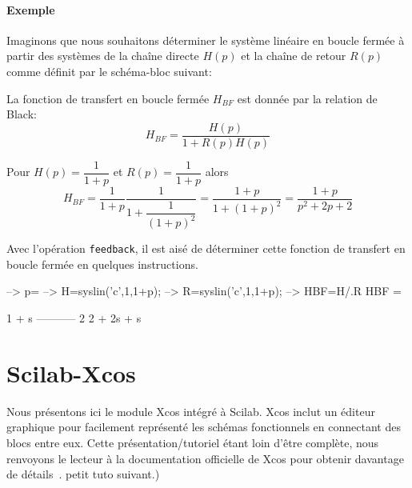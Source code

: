 \paragraph{Exemple}
Imaginons que nous souhaitons déterminer
le système linéaire en boucle fermée à partir des systèmes de la chaîne 
directe $H(p)$ et la chaîne de retour $R(p)$ comme définit par le schéma-bloc 
suivant:
\begin{center}
    
\end{center}
La fonction de transfert en boucle fermée $H_{BF}$ est donnée par la relation 
de Black:
$$
H_{BF}=\dfrac{H(p)}{1+R(p)H(p)}
$$

Pour $H(p)=\dfrac{1}{1+p}$ et $R(p)=\dfrac{1}{1+p}$ alors 
$$
H_{BF}=\dfrac{1}{1+p}\dfrac{1}{1+\dfrac{1}{(1+p)^2}}
      =\dfrac{1+p}{1+(1+p)^2}=\dfrac{1+p}{p^2+2p+2}
$$

Avec l'opération \verb?feedback?, il est aisé de déterminer cette fonction 
de transfert en boucle fermée en quelques instructions.
\begin{Scilabcode}
--> p=%
--> H=syslin('c',1,1+p);
--> R=syslin('c',1,1+p);
--> HBF=H/.R
 HBF  = 
                 
       1 + s      
     -----------  
               2  
     2 + 2s + s 
\end{Scilabcode}
\section{Scilab-Xcos}
Nous présentons ici le module Xcos intégré à Scilab. Xcos inclut un 
éditeur graphique pour facilement représenté les schémas fonctionnels
en connectant des blocs entre eux. Cette présentation/tutoriel étant loin 
d'être complète, nous renvoyons le lecteur à la documentation officielle de 
Xcos pour obtenir davantage de détails~\cite{steer2014scilab,premier,xcos}. 
petit tuto suivant.)

